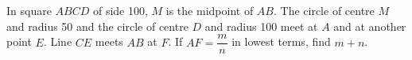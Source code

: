 In square $ABCD$ of side 100, $M$ is the midpoint of $AB$. The circle of centre $M$ and radius 50 and the circle of centre $D$ and radius 100 meet at $A$ and at another point $E$. Line $CE$ meets $AB$ at $F$. If $AF=\dfrac{m}{n}$ in lowest terms, find $m+n$.
